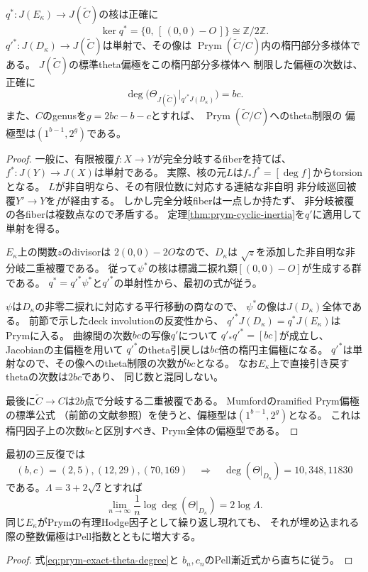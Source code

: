 \begin{theorem}[楕円因子の核と誘導偏極]
\label{thm:prym-elliptic-theta-degree}
$q^*:J(E_\kappa)\to J(\widetilde C)$の核は正確に
\[
 \boxed{\ker q^*
 =\bigl\{0,\,[\,(0,0)-O\,]\bigr\}
 \cong\mathbb Z/2\mathbb Z.}
\]
$q'^*:J(D_\kappa)\to J(\widetilde C)$は単射で、その像は
$\operatorname{Prym}(\widetilde C/C)$内の楕円部分多様体である。
$J(\widetilde C)$の標準theta偏極をこの楕円部分多様体へ
制限した偏極の次数は、正確に
\begin{equation}\label{eq:prym-exact-theta-degree}
 \boxed{\deg\bigl(\Theta_{J(\widetilde C)}|_{q'^*J(D_\kappa)}\bigr)=bc.}
\end{equation}
また、$C$のgenusを$g=2bc-b-c$とすれば、
$\operatorname{Prym}(\widetilde C/C)$へのtheta制限の
偏極型は$(1^{b-1},2^g)$である。
\end{theorem}
\begin{proof}
一般に、有限被覆$f:X\to Y$が完全分岐するfiberを持てば、
$f^*:J(Y)\to J(X)$は単射である。
実際、核の元$L$は$f_*f^*=[\deg f]$からtorsionとなる。
$L$が非自明なら、その有限位数に対応する連結な非自明
非分岐巡回被覆$Y'\to Y$を$f$が経由する。
しかし完全分岐fiberは一点しか持たず、
非分岐被覆の各fiberは複数点なので矛盾する。
定理\ref{thm:prym-cyclic-inertia}を$q'$に適用して単射を得る。

$E_\kappa$上の関数$z$のdivisorは
$2(0,0)-2O$なので、$D_\kappa$は
$\sqrt z$を添加した非自明な非分岐二重被覆である。
従って$\psi^*$の核は標識二捩れ類$[(0,0)-O]$が生成する群である。
$q^*=q'^*\psi^*$と$q'^*$の単射性から、最初の式が従う。

$\psi$は$D_\kappa$の非零二捩れに対応する平行移動の商なので、
$\psi^*$の像は$J(D_\kappa)$全体である。
前節で示したdeck involutionの反変性から、
$q'^*J(D_\kappa)=q^*J(E_\kappa)$はPrymに入る。
曲線間の次数$bc$の写像$q'$について
$q'_*q'^*=[bc]$が成立し、Jacobianの主偏極を用いて
$q'^*$のtheta引戻しは$bc$倍の楕円主偏極になる。
$q'^*$は単射なので、その像へのtheta制限の次数が$bc$となる。
なお$E_\kappa$上で直接引き戻すthetaの次数は$2bc$であり、
同じ数と混同しない。

最後に$\widetilde C\to C$は$2b$点で分岐する二重被覆である。
Mumfordのramified Prym偏極の標準公式
（前節の文献参照）を使うと、偏極型は$(1^{b-1},2^g)$となる。
これは楕円因子上の次数$bc$と区別すべき、Prym全体の偏極型である。
\end{proof}

\begin{corollary}[Pell力学がPrymの整数偏極に現れる]
\label{cor:prym-pell-theta-growth}
最初の三反復では
\[
 (b,c)=(2,5),(12,29),(70,169)
 \quad\Longrightarrow\quad
 \deg(\Theta|_{D_\kappa})=10,348,11830
\]
である。$\Lambda=3+2\sqrt2$とすれば
\[
 \lim_{n\to\infty}\frac1n
   \log\deg(\Theta|_{D_\kappa})=2\log\Lambda.
\]
同じ$E_\kappa$がPrymの有理Hodge因子として繰り返し現れても、
それが埋め込まれる際の整数偏極はPell指数とともに増大する。
\end{corollary}
\begin{proof}
式\eqref{eq:prym-exact-theta-degree}と
$b_n,c_n$のPell漸近式から直ちに従う。
\end{proof}

